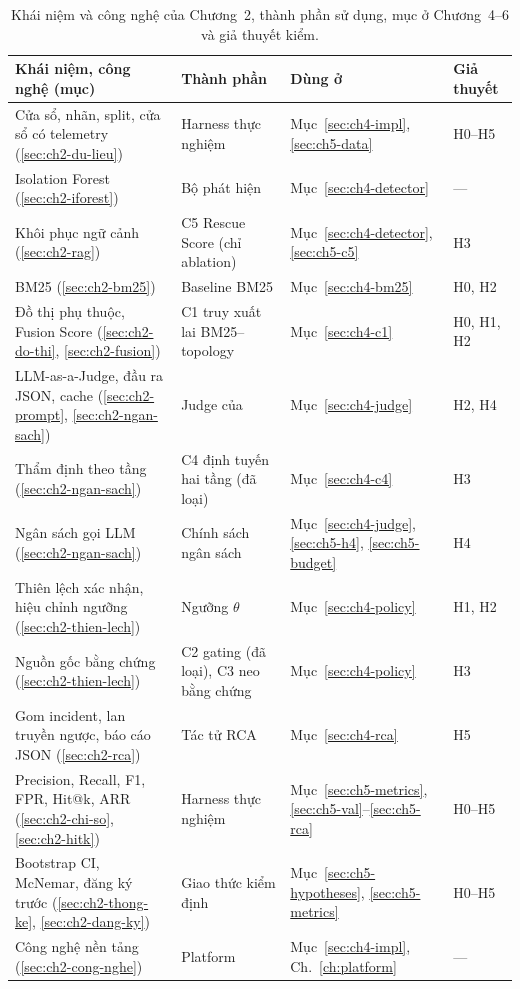 \begin{table}[htbp]
  \centering
  \caption{Khái niệm và công nghệ của Chương~2, thành phần sử dụng, mục ở Chương~4--6 và giả thuyết kiểm.}
  \label{tab:ch2-doi-chieu}
  \begin{tabularx}{\linewidth}{@{}Y Y l l@{}}
    \toprule
    \textbf{Khái niệm, công nghệ (mục)} & \textbf{Thành phần} & \textbf{Dùng ở} & \textbf{Giả thuyết} \\
    \midrule
    Cửa sổ, nhãn, split, cửa sổ có telemetry (\ref{sec:ch2-du-lieu}) & Harness thực nghiệm & Mục~\ref{sec:ch4-impl}, \ref{sec:ch5-data} & H0--H5 \\
    Isolation Forest (\ref{sec:ch2-iforest}) & Bộ phát hiện & Mục~\ref{sec:ch4-detector} & --- \\
    Khôi phục ngữ cảnh (\ref{sec:ch2-rag}) & C5 Rescue Score (chỉ ablation) & Mục~\ref{sec:ch4-detector}, \ref{sec:ch5-c5} & H3 \\
    BM25 (\ref{sec:ch2-bm25}) & Baseline BM25 & Mục~\ref{sec:ch4-bm25} & H0, H2 \\
    Đồ thị phụ thuộc, Fusion Score (\ref{sec:ch2-do-thi}, \ref{sec:ch2-fusion}) & C1 truy xuất lai BM25--topology & Mục~\ref{sec:ch4-c1} & H0, H1, H2 \\
    LLM-as-a-Judge, đầu ra JSON, cache (\ref{sec:ch2-prompt}, \ref{sec:ch2-ngan-sach}) & Judge của \CTAV{} & Mục~\ref{sec:ch4-judge} & H2, H4 \\
    Thẩm định theo tầng (\ref{sec:ch2-ngan-sach}) & C4 định tuyến hai tầng (đã loại) & Mục~\ref{sec:ch4-c4} & H3 \\
    Ngân sách gọi LLM (\ref{sec:ch2-ngan-sach}) & Chính sách ngân sách & Mục~\ref{sec:ch4-judge}, \ref{sec:ch5-h4}, \ref{sec:ch5-budget} & H4 \\
    Thiên lệch xác nhận, hiệu chỉnh ngưỡng (\ref{sec:ch2-thien-lech}) & Ngưỡng $\theta$ & Mục~\ref{sec:ch4-policy} & H1, H2 \\
    Nguồn gốc bằng chứng (\ref{sec:ch2-thien-lech}) & C2 gating (đã loại), C3 neo bằng chứng & Mục~\ref{sec:ch4-policy} & H3 \\
    Gom incident, lan truyền ngược, báo cáo JSON (\ref{sec:ch2-rca}) & Tác tử RCA & Mục~\ref{sec:ch4-rca} & H5 \\
    Precision, Recall, F1, FPR, Hit@k, ARR (\ref{sec:ch2-chi-so}, \ref{sec:ch2-hitk}) & Harness thực nghiệm & Mục~\ref{sec:ch5-metrics}, \ref{sec:ch5-val}--\ref{sec:ch5-rca} & H0--H5 \\
    Bootstrap CI, McNemar, đăng ký trước (\ref{sec:ch2-thong-ke}, \ref{sec:ch2-dang-ky}) & Giao thức kiểm định & Mục~\ref{sec:ch5-hypotheses}, \ref{sec:ch5-metrics} & H0--H5 \\
    Công nghệ nền tảng (\ref{sec:ch2-cong-nghe}) & Platform & Mục~\ref{sec:ch4-impl}, Ch.~\ref{ch:platform} & --- \\
    \bottomrule
  \end{tabularx}
\end{table}
